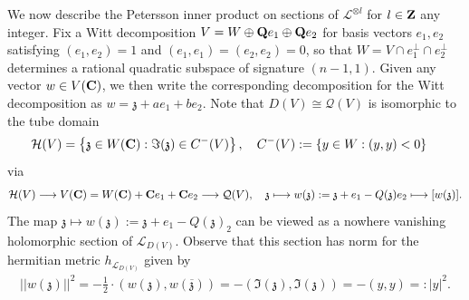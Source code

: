 \documentclass{amsart}
\theoremstyle{definition}
\theoremstyle{definition}
\theoremstyle{definition}
\begin{document}
We now describe the Petersson inner product on sections of $\mathcal{L}^{\otimes l}$ for $l \in {\bf{Z}}$ any integer. 
Fix a Witt decomposition $V = W \oplus {\bf{Q}} e_1 \oplus {\bf{Q}} e_2$ for basis vectors $e_1, e_2$ satisfying $(e_1, e_2)=1$
and $(e_1, e_1) = (e_2, e_2) = 0$, so that $W = V \cap e_1^{\perp} \cap e_2^{\perp}$ determines a rational quadratic subspace of signature $(n-1, 1)$.
Given any vector $w \in V({\bf{C}})$, we then write the corresponding decomposition for the Witt decomposition as $w = \mathfrak{z} + a e_1 + b e_2$.
Note that $D(V) \cong \mathcal{Q}(V)$ is isomorphic to the tube domain 
\begin{align*} \mathcal{H}(V) &= \left\lbrace \mathfrak{z} \in W({\bf{C}}) : \Im(\mathfrak{z}) \in C^-(V) \right\rbrace, 
\quad C^-(V) := \left\lbrace y \in W: (y, y) < 0 \right\rbrace \end{align*} via
\begin{align*} \mathcal{H}(V) \longrightarrow V({\bf{C}}) = W({\bf{C}}) + {\bf{C}} e_1 + {\bf{C}} e_2 \longrightarrow \mathcal{Q}(V), 
\quad \mathfrak{z} \longmapsto w(\mathfrak{z}) := \mathfrak{z} + e_1 - Q(\mathfrak{z}) e_2 \longmapsto [w(\mathfrak{z})]. \end{align*}
The map $\mathfrak{z} \longmapsto w(\mathfrak{z}) := \mathfrak{z} + e_1 - Q(\mathfrak{z}) _2$ can be viewed as a nowhere vanishing
holomorphic section of $\mathcal{L}_{D(V)}$. Observe that this section has norm for the hermitian metric $h_{\mathcal{L}_{D(V)}}$ given by
\begin{align*} \vert \vert w(\mathfrak{z}) \vert \vert ^2 = - \frac{1}{2} \cdot \left( w(\mathfrak{z}), w(\overline{\mathfrak{z}}) \right) 
= - \left( \Im(\mathfrak{z}), \Im(\mathfrak{z}) \right) = -(y,y) =: \vert y \vert^2. \end{align*}
\end{document}
